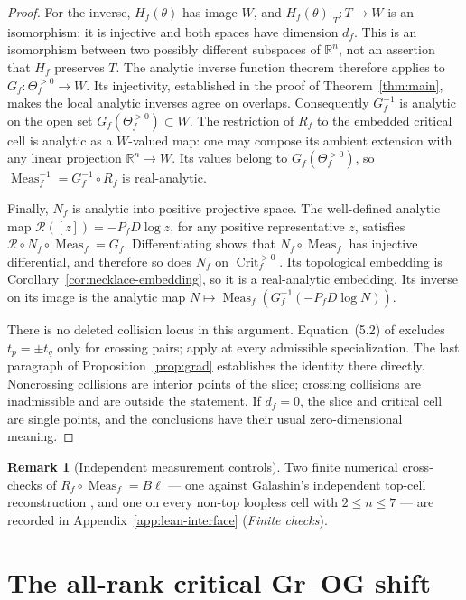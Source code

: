 \documentclass[11pt]{article}
\theoremstyle{definition}
\newtheorem{remark}[theorem]{Remark}
\DeclareMathOperator{\Meas}{Meas}
\DeclareMathOperator{\Crit}{Crit}
\newcommand{\Thef}{\Theta_f^{>0}}
\newcommand{\Critf}{\Crit_f^{>0}}
\begin{document}
\begin{proof}
For the inverse, $H_f(\theta)$ has image $W$, and $H_f(\theta)|_T:T\to W$
is an isomorphism: it is injective and both spaces have dimension $d_f$.
This is an isomorphism between two possibly different subspaces of
$\mathbb R^n$, not an assertion that $H_f$ preserves $T$.
The analytic inverse function theorem therefore applies to
$G_f:\Thef\to W$. Its injectivity, established in the proof of
Theorem~\ref{thm:main}, makes the local analytic inverses agree on overlaps.
Consequently $G_f^{-1}$ is analytic on the open set $G_f(\Thef)\subset W$.
The restriction of $R_f$ to the embedded critical cell is analytic as a
$W$-valued map: one may compose its ambient extension with any linear
projection $\mathbb R^n\to W$. Its values belong to $G_f(\Thef)$, so
$\Meas_f^{-1}=G_f^{-1}\circ R_f$ is real-analytic.

Finally, $N_f$ is analytic into positive projective space. The well-defined
analytic map $\mathcal R([z])=-P_fD\log z$, for any positive representative $z$,
satisfies $\mathcal R\circ N_f\circ\Meas_f=G_f$. Differentiating shows that
$N_f\circ\Meas_f$ has injective differential, and therefore so does
$N_f$ on $\Critf$. Its topological embedding is
Corollary~\ref{cor:necklace-embedding}, so it is a real-analytic embedding.
Its inverse on its image is the analytic map
$N\mapsto\Meas_f(G_f^{-1}(-P_fD\log N))$.

There is no deleted collision locus in this argument. Equation~(5.2) of
\cite{Galashin} excludes $t_p=\pm t_q$ only for crossing pairs;
\cite[Prop.~5.1 and Lem.~5.13]{Galashin} apply at every admissible
specialization. The last paragraph of Proposition~\ref{prop:grad}
establishes the identity there directly. Noncrossing collisions are
interior points of the slice; crossing collisions are inadmissible and
are outside the statement. If $d_f=0$, the slice and critical cell are
single points, and the conclusions have their usual zero-dimensional
meaning.
\end{proof}

\begin{remark}[Independent measurement controls]\label{rem:top-cell-control}
Two finite numerical cross-checks of $R_f\circ\Meas_f=B\ell$ --- one against Galashin's independent
top-cell reconstruction \cite[\S9]{Galashin}, and one on every non-top loopless cell with $2\le n\le7$
--- are recorded in Appendix~\ref{app:lean-interface} (\emph{Finite checks}).
\end{remark}

\section{The all-rank critical Gr--OG shift}\label{sec:shift}
\end{document}
